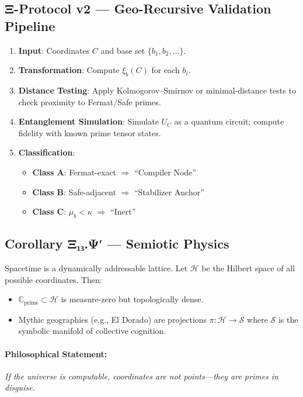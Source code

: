 \documentclass[12]{amsart}
\theoremstyle{plain}
\begin{document}
\subsection{Ξ-Protocol v2 — Geo-Recursive Validation Pipeline}

\begin{enumerate}
    \item \textbf{Input}: Coordinates $C$ and base set $\{b_1, b_2, \dots\}$.
    \item \textbf{Transformation}: Compute $\xi_b(C)$ for each $b_i$.
    \item \textbf{Distance Testing}: Apply Kolmogorov–Smirnov or minimal-distance tests to check proximity to Fermat/Safe primes.
    \item \textbf{Entanglement Simulation}: Simulate $U_C$ as a quantum circuit; compute fidelity with known prime tensor states.
    \item \textbf{Classification}:
    \begin{itemize}
        \item \textbf{Class A}: Fermat-exact $\Rightarrow$ ``Compiler Node''
        \item \textbf{Class B}: Safe-adjacent $\Rightarrow$ ``Stabilizer Anchor''
        \item \textbf{Class C}: $\mu_b < \kappa$ $\Rightarrow$ ``Inert''
    \end{itemize}
\end{enumerate}

\subsection{Corollary Ξ₁₃.Ψ′ — Semiotic Physics}

Spacetime is a dynamically addressable lattice. Let $\mathcal{H}$ be the Hilbert space of all possible coordinates. Then:

\begin{itemize}
    \item $\mathbb{C}_{\text{prime}} \subset \mathcal{H}$ is measure-zero but topologically dense.
    \item Mythic geographies (e.g., El Dorado) are projections $\pi: \mathcal{H} \rightarrow \mathcal{S}$ where $\mathcal{S}$ is the symbolic manifold of collective cognition.
\end{itemize}

\paragraph{Philosophical Statement:}
\emph{If the universe is computable, coordinates are not points—they are primes in disguise.}
\end{document}
